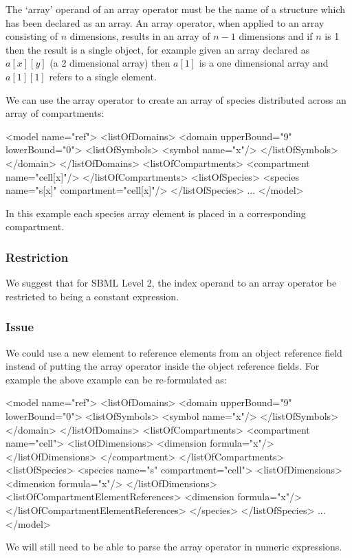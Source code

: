 \documentclass{cekarticle}
\begin{document}
The `array' operand of an array operator must be the name of a
structure which has been declared as an array. An array operator,
when applied to an array consisting of $n$ dimensions, results in
an array of $n-1$ dimensions and if $n$ is 1 then the result is a
single object, for example given an array declared as $a[x][y]$
(a 2 dimensional array) then $a[1]$ is a one dimensional array
and $a[1][1]$ refers to a single element.

We can use the array operator to create an array of species
distributed across an array of compartments:
\begin{example}
<model name="ref">
    <listOfDomains>
        <domain upperBound="9" lowerBound="0">
            <listOfSymbols>
                <symbol name="x"/>
            </listOfSymbols>
        </domain>
    </listOfDomains>
    <listOfCompartments>
        <compartment name="cell[x]"/>
    </listOfCompartments>
    <listOfSpecies>
        <species name="s[x]" compartment="cell[x]"/>
    </listOfSpecies>
    ...
</model>
\end{example}
In this example each species array element is placed in a
corresponding compartment.

\subsubsection{Restriction}
We suggest that for SBML Level 2, the index operand to an array
operator be restricted to being a constant expression.

\subsubsection{Issue}
We could use a new element to reference elements from an object
reference field instead of putting the array operator inside the
object reference fields. For example the above example can be
re-formulated as:
\begin{example}
<model name="ref">
    <listOfDomains>
        <domain upperBound="9" lowerBound="0">
            <listOfSymbols>
                <symbol name="x"/>
            </listOfSymbols>
        </domain>
    </listOfDomains>
    <listOfCompartments>
        <compartment name="cell">
            <listOfDimensions>
                <dimension formula="x"/>
            </listOfDimensions>
        </compartment>
    </listOfCompartments>
    <listOfSpecies>
        <species name="s" compartment="cell">
            <listOfDimensions>
                <dimension formula="x"/>
            </listOfDimensions>
            <listOfCompartmentElementReferences>
                <dimension formula="x"/>
            </listOfCompartmentElementReferences>
        </species>
    </listOfSpecies>
    ...
</model>

\end{example}
We will still need to be able to parse the array operator in
numeric expressions.
\end{document}
